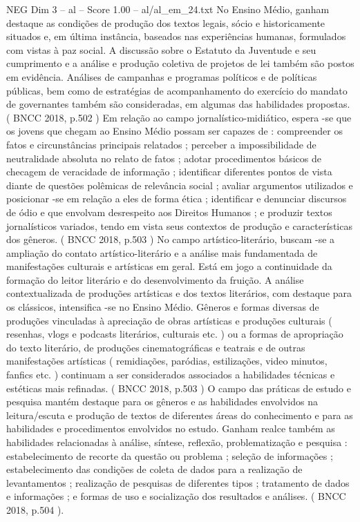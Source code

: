 \begin{textsample}{NEG Dim 3 – al – Score 1.00 – al/al\_em\_24.txt}
No Ensino Médio, ganham destaque as condições de produção dos textos legais, sócio e historicamente situados e, em última instância, baseados nas experiências humanas, formulados com vistas à paz social.
A discussão sobre o Estatuto da Juventude e seu cumprimento e a análise e produção coletiva de projetos de lei também são postos em evidência.
Análises de campanhas e programas políticos e de políticas públicas, bem como de estratégias de acompanhamento do exercício do mandato de governantes também são consideradas, em algumas das habilidades propostas. ( BNCC 2018, p.502 ) Em relação ao campo jornalístico-midiático, espera -se que os jovens que chegam ao Ensino Médio possam ser capazes de : compreender os fatos e circunstâncias principais relatados ; perceber a impossibilidade de neutralidade absoluta no relato de fatos ; adotar procedimentos básicos de checagem de veracidade de informação ; identificar diferentes pontos de vista diante de questões polêmicas de relevância social ; avaliar argumentos utilizados e posicionar -se em relação a eles de forma ética ; identificar e denunciar discursos de ódio e que envolvam desrespeito aos Direitos Humanos ; e produzir textos jornalísticos variados, tendo em vista seus contextos de produção e características dos gêneros. ( BNCC 2018, p.503 ) No campo artístico-literário, buscam -se a ampliação do contato artístico-literário e a análise mais fundamentada de manifestações culturais e artísticas em geral.
Está em jogo a continuidade da formação do leitor literário e do desenvolvimento da fruição.
A análise contextualizada de produções artísticas e dos textos literários, com destaque para os clássicos, intensifica -se no Ensino Médio.
Gêneros e formas diversas de produções vinculadas à apreciação de obras artísticas e produções culturais ( resenhas, vlogs e podcasts literários, culturais etc. ) ou a formas de apropriação do texto literário, de produções cinematográficas e teatrais e de outras manifestações artísticas ( remidiações, paródias, estilizações, video minutos, fanfics etc. ) continuam a ser considerados associados a habilidades técnicas e estéticas mais refinadas. ( BNCC 2018, p.503 ) O campo das práticas de estudo e pesquisa mantém destaque para os gêneros e as habilidades envolvidos na leitura/escuta e produção de textos de diferentes áreas do conhecimento e para as habilidades e procedimentos envolvidos no estudo.
Ganham realce também as habilidades relacionadas à análise, síntese, reflexão, problematização e pesquisa : estabelecimento de recorte da questão ou problema ; seleção de informações ; estabelecimento das condições de coleta de dados para a realização de levantamentos ; realização de pesquisas de diferentes tipos ; tratamento de dados e informações ; e formas de uso e socialização dos resultados e análises. ( BNCC 2018, p.504 ).

\end{textsample}
